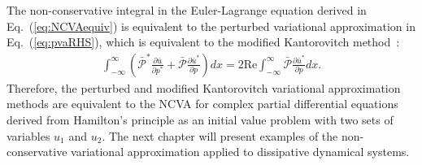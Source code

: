 The non-conservative integral in the Euler-Lagrange equation derived in Eq.~(\ref{eq:NCVAequiv}) is equivalent to the perturbed variational approximation in Eq.~(\ref{eq:pvaRHS}), which is equivalent to the modified Kantorovitch method~\cite{Cerda}:
\begin{align}
 \int_{-\infty}^{\infty} \left( \bar{\mathcal{P}}^* \frac{\partial  \bar{u}}{\partial p^* } + \bar{\mathcal{P}} \frac{\partial  \bar{u}^*}{\partial p} \right) dx   = 2 \mathrm{Re} \int_{-\infty}^{\infty} \bar{\mathcal{P}} \frac{\partial  \bar{u}^*}{\partial p }dx.
\end{align}
Therefore, the perturbed and modified Kantorovitch variational approximation methods are equivalent to the NCVA for complex partial differential equations derived from Hamilton's principle as an initial value problem with two sets of variables $u_1$ and $u_2$.  The next chapter will present examples of the non-conservative variational approximation applied to dissipative dynamical systems. 

\clearpage


%
%


%

